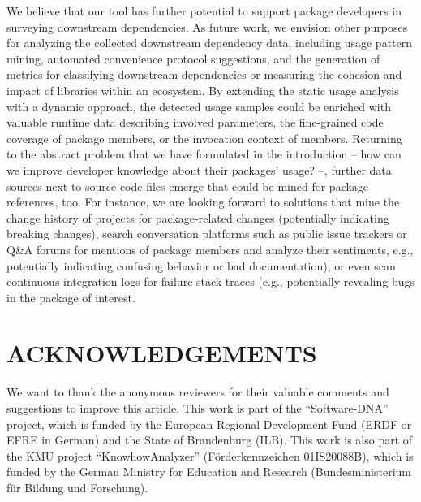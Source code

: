\documentclass[a4paper,twoside]{article}
\begin{document}
We believe that our tool has further potential to support package developers in surveying downstream dependencies.
As future work, we envision other purposes for analyzing the collected downstream dependency data, including usage pattern mining, automated convenience protocol suggestions, and the generation of metrics for classifying downstream dependencies or measuring the cohesion and impact of libraries within an ecosystem.
By extending the static usage analysis with a dynamic approach, the detected usage samples could be enriched with valuable runtime data describing involved parameters, the fine-grained code coverage of package members, or the invocation context of members.
Returning to the abstract problem that we have formulated in the introduction -- how can we improve developer knowledge about their packages' usage? --, further data sources next to source code files emerge that could be mined for package references, too.
For instance, we are looking forward to solutions that mine the change history of projects for package-related changes (potentially indicating breaking changes), search conversation platforms such as public issue trackers or Q\&A forums for mentions of package members and analyze their sentiments, e.g., potentially indicating confusing behavior or bad documentation), or even scan continuous integration logs for failure stack traces (e.g., potentially revealing bugs in the package of interest.



\section*{\uppercase{Acknowledgements}}

We want to thank the anonymous reviewers for their valuable comments and suggestions to improve this article.
This work is part of the \enquote{Software-DNA} project, which is funded by the European Regional Development Fund (ERDF or EFRE in German) and the State of Brandenburg (ILB).
This work is also part of the KMU project \enquote{KnowhowAnalyzer} (Förderkennzeichen 01IS20088B), which is funded by the German Ministry for Education and Research (Bundesministerium für Bildung und Forschung).



{\small%
}
\end{document}
